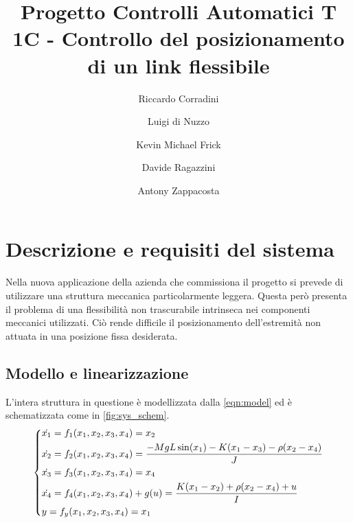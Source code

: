 \documentclass[a4paper]{article}
\title{Progetto Controlli Automatici T \\ 1C - Controllo del posizionamento di un link flessibile}
\author{Riccardo Corradini \and Luigi di Nuzzo \and Kevin Michael Frick \and Davide Ragazzini \and Antony Zappacosta}
\newenvironment{eqsys}{\begin{equation}\begin{dcases}}{\end{dcases}\end{equation}}
\begin{document}
\maketitle
\tableofcontents
\clearpage
\section{Descrizione e requisiti del sistema}
Nella nuova applicazione della azienda che commissiona il progetto si prevede di utilizzare una struttura meccanica particolarmente leggera. 
Questa però presenta il problema di una flessibilità non trascurabile intrinseca nei componenti meccanici utilizzati. 
Ciò rende difficile il posizionamento dell’estremità non attuata in una posizione fissa desiderata.
\subsection{Modello e linearizzazione}
L’intera struttura in questione è modellizzata dalla \cref{eqn:model} ed è schematizzata come in \cref{fig:sys_schem}.
\begin{eqsys}       
    \label{eqn:model}
    \dot{x_1}  =  f_1 (x_1, x_2, x_3, x_4)  =  x_2 \\
    \dot{x_2}  =  f_2 (x_1, x_2, x_3, x_4)  =  \frac{-M g L \sin (x_1) - K (x_1 - x_3) - \rho (x_2 - x_4)}{J} \\
    \dot{x_3}  =  f_3 (x_1, x_2, x_3, x_4)  =  x_4 \\
    \dot{x_4}  =  f_4 (x_1, x_2, x_3, x_4) + g(u)  =  \frac{K(x_1 - x_2) + \rho (x_2 - x_4) + u}{I}\\
    y  =  f_y (x_1, x_2, x_3, x_4)  =  x_1
\end{eqsys}
\end{document}
